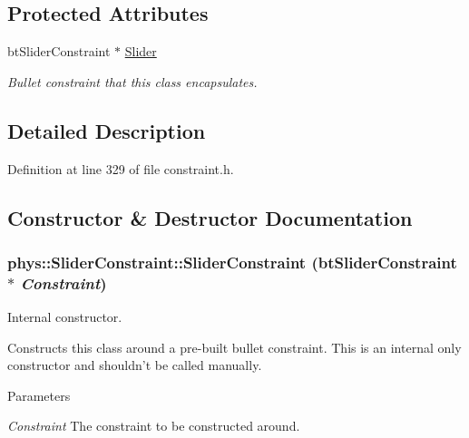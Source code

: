 \subsection*{Protected Attributes}
\begin{DoxyCompactItemize}
\item 
\hypertarget{classphys_1_1SliderConstraint_ae99629f3e87f72d3271ff82137fa81e2}{
btSliderConstraint $\ast$ \hyperlink{classphys_1_1SliderConstraint_ae99629f3e87f72d3271ff82137fa81e2}{Slider}}
\label{dc/d72/classphys_1_1SliderConstraint_ae99629f3e87f72d3271ff82137fa81e2}

\begin{DoxyCompactList}\small\item\em Bullet constraint that this class encapsulates. \item\end{DoxyCompactList}\end{DoxyCompactItemize}


\subsection{Detailed Description}


Definition at line 329 of file constraint.h.



\subsection{Constructor \& Destructor Documentation}
\hypertarget{classphys_1_1SliderConstraint_a142708184f0a445edadddc4ad5ca08b5}{
\subsubsection[{SliderConstraint}]{\setlength{\rightskip}{0pt plus 5cm}phys::SliderConstraint::SliderConstraint (btSliderConstraint $\ast$ {\em Constraint})}}
\label{dc/d72/classphys_1_1SliderConstraint_a142708184f0a445edadddc4ad5ca08b5}


Internal constructor. 

Constructs this class around a pre-\/built bullet constraint. This is an internal only constructor and shouldn't be called manually. 
\begin{DoxyParams}{Parameters}
\item[{\em Constraint}]The constraint to be constructed around. \end{DoxyParams}



